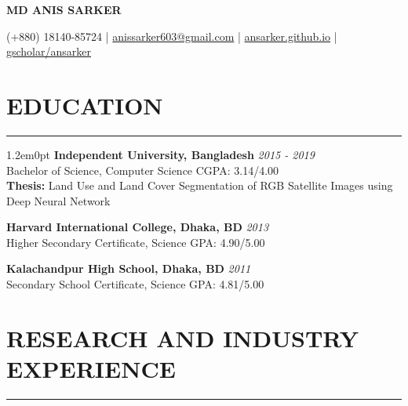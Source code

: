 \documentclass[a4paper,10pt]{article}
\begin{document}
\pagestyle{empty}

\begin{center}
{\fontsize{16}{18}\selectfont \textbf{MD ANIS SARKER}}\\[2pt]
\end{center}

\begin{center}
(+880) 18140-85724 |
\textcolor{theme_2}{\href{mailto:anissarker603@gmail.com}{anissarker603@gmail.com}} |
\textcolor{theme_2}{\href{https://ansarker.github.io/}{ansarker.github.io}} |
\textcolor{theme_2}{\href{https://scholar.google.com/citations?user=UePcz9EAAAAJ&hl=en}{gscholar/ansarker}}
\end{center}


\section*{EDUCATION}
\hrule\vspace{0.6em}

\begin{adjustwidth}{1.2em}{0pt}
\textbf{Independent University, Bangladesh} \hfill \textit{2015 - 2019}\\
Bachelor of Science, Computer Science \hfill CGPA: 3.14/4.00\\
\textbf{Thesis:} Land Use and Land Cover Segmentation of RGB Satellite Images using Deep Neural Network

\vspace{0.1em}

\textbf{Harvard International College, Dhaka, BD} \hfill \textit{2013}\\
Higher Secondary Certificate, Science \hfill GPA: 4.90/5.00

\vspace{0.1em}

\textbf{Kalachandpur High School, Dhaka, BD} \hfill \textit{2011}\\
Secondary School Certificate, Science \hfill GPA: 4.81/5.00
\end{adjustwidth}

\section*{RESEARCH AND INDUSTRY EXPERIENCE}
\hrule\vspace{0.6em}
\end{document}
